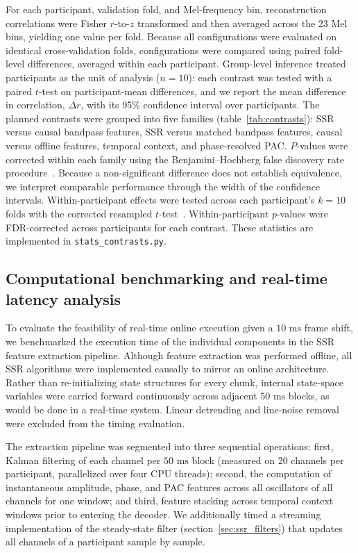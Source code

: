 \documentclass{iopjournal}
\begin{document}
For each participant, validation fold, and Mel-frequency bin, reconstruction correlations were Fisher $r$-to-$z$ transformed and then averaged across the 23 Mel bins, yielding one value per fold. Because all configurations were evaluated on identical cross-validation folds, configurations were compared using paired fold-level differences, averaged within each participant. Group-level inference treated participants as the unit of analysis ($n = 10$): each contrast was tested with a paired $t$-test on participant-mean differences, and we report the mean difference in correlation, $\Delta r$, with its 95\% confidence interval over participants. The planned contrasts were grouped into five families (table~\ref{tab:contrasts}): SSR versus causal bandpass features, SSR versus matched bandpass features, causal versus offline features, temporal context, and phase-resolved PAC. $P$-values were corrected within each family using the Benjamini--Hochberg false discovery rate procedure~\cite{benjamini1995}. Because a non-significant difference does not establish equivalence, we interpret comparable performance through the width of the confidence intervals. Within-participant effects were tested across each participant's $k = 10$ folds with the corrected resampled $t$-test~\cite{nadeau2003}. Within-participant $p$-values were FDR-corrected across participants for each contrast. These statistics are implemented in \texttt{stats\_contrasts.py}.

\subsection{Computational benchmarking and real-time latency analysis}

To evaluate the feasibility of real-time online execution given a $10\text{ ms}$ frame shift, we benchmarked the execution time of the individual components in the SSR feature extraction pipeline. Although feature extraction was performed offline, all SSR algorithms were implemented causally to mirror an online architecture. Rather than re-initializing state structures for every chunk, internal state-space variables were carried forward continuously across adjacent $50\text{ ms}$ blocks, as would be done in a real-time system. Linear detrending and line-noise removal were excluded from the timing evaluation.

The extraction pipeline was segmented into three sequential operations: first, Kalman filtering of each channel per $50\text{ ms}$ block (measured on 20 channels per participant, parallelized over four CPU threads); second, the computation of instantaneous amplitude, phase, and PAC features across all oscillators of all channels for one window; and third, feature stacking across temporal context windows prior to entering the decoder. We additionally timed a streaming implementation of the steady-state filter (section~\ref{sec:ssr_filters}) that updates all channels of a participant sample by sample.
\end{document}
